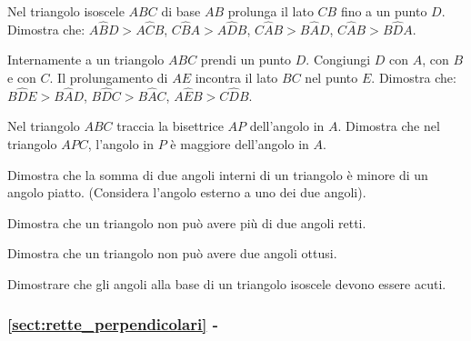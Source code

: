 \begin{esercizio}
\label{ese:3.3}
Nel triangolo isoscele \(ABC\) di base \(AB\) prolunga il lato \(CB\) fino 
a un punto \(D\). Dimostra che: \(A\widehat{B}D>A\widehat{C}B\), 
\(C\widehat{B}A>A\widehat{D}B\), \(C\widehat{A}B>B\widehat{A}D\), 
\(C\widehat{A}B>B\widehat{D}A\).
\end{esercizio}

\begin{esercizio}
\label{ese:3.4}
Internamente a un triangolo \(ABC\) prendi un punto \(D\). Congiungi \(D\) 
con \(A\), con \(B\) e con \(C\). Il prolungamento di \(AE\) incontra il lato 
\(BC\) nel punto \(E\). Dimostra che: \(B\widehat{D}E>B\widehat{A}D\), 
\(B\widehat{D}C>B\widehat{A}C\), \(A\widehat{E}B>C\widehat{D}B\).
\end{esercizio}

\begin{esercizio}
\label{ese:3.5}
Nel triangolo \(ABC\) traccia la bisettrice \(AP\) dell'angolo in \(A\). 
Dimostra che nel triangolo \(APC\), l'angolo in \(P\) è maggiore 
dell'angolo in \(A\).
\end{esercizio}

\begin{esercizio}
\label{ese:3.6}
Dimostra che la somma di due angoli interni di un triangolo è minore 
di un angolo piatto. (Considera l'angolo esterno a uno dei due 
angoli).
\end{esercizio}

\begin{esercizio}
\label{ese:3.7}
Dimostra che un triangolo non può avere più di due angoli retti.
\end{esercizio}

\begin{esercizio}
\label{ese:3.8}
Dimostra che un triangolo non può avere due angoli ottusi.
\end{esercizio}

\begin{esercizio}
\label{ese:3.9}
Dimostrare che gli angoli alla base di un triangolo isoscele devono 
essere acuti.
\end{esercizio}

\begingroup
\hypersetup{linkcolor=black}
\subsubsection*{\ref{sect:rette_perpendicolari} - 
}
\endgroup

